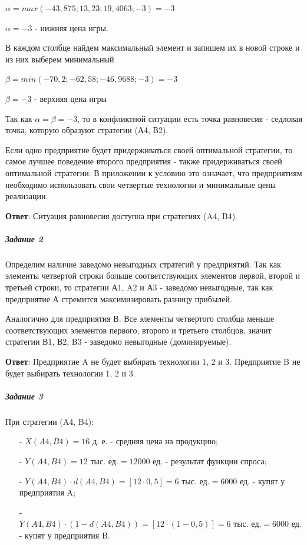 $\alpha = max(-43,875; 13,23; 19,4063; -3) = -3$

$\alpha = -3$ - нижняя цена игры.

В каждом столбце найдем максимальный элемент и запишем их в новой строке и из них
выберем минимальный

$\beta = min(-70,2; -62,58; -46,9688; -3) = -3$

$\beta = -3$ - верхняя цена игры

Так как $\alpha = \beta = -3$, то в конфликтной ситуации есть точка равновесия - седловая
точка, которую образуют стратегии (А4, В2).

Если одно предприятие будет придерживаться своей оптимальной стратегии,
то самое лучшее поведение второго предприятия - также придерживаться своей оптимальной стратегии.
В приложении к условию это означает, что предприятиям необходимо
использовать свои четвертые технологии и минимальные цены реализации.

\textbf{Ответ}: Ситуация равновесия доступна при стратегиях (A4, B4). 

\subparagraph{Задание 2} \hspace{0pt}

Определим наличие заведомо невыгодных стратегий у предприятий.
Так как элементы четвертой строки больше соответствующих элементов первой, второй и третьей строки,
то стратегии А1, A2 и А3 - заведомо невыгодные, так как предприятие А стремится максимизировать разницу прибылей.

Аналогично для предприятия В. Все элементы четвертого столбца меньше соответствующих элементов первого, второго и третьего столбцов,
значит стратегии В1, В2, B3 - заведомо невыгодные (доминируемые).

\textbf{Ответ}: Предприятие A не будет выбирать технологии 1, 2 и 3.
Предприятие B не будет выбирать технологии 1, 2 и 3.

\subparagraph{Задание 3} \hspace{0pt}

При стратегии (A4, B4):
\begin{enumerate}
  \item[-] $X(A4, B4) = 16 \text{ д. е.}$ - средняя цена на продукцию;
  \item[-] $Y(A4, B4) = 12 \text{ тыс. ед.} = 12000 \text{ ед.}$ - результат функции спроса;
  \item[-] $Y(A4, B4) \cdot  d(A4, B4) = [12 \cdot 0,5] = 6 \text{ тыс. ед.} = 6000 \text{ ед.}$ - купят у предприятия A;
  \item[-] $Y(A4, B4) \cdot (1 - d(A4, B4)) = [12 \cdot (1-0,5)] = 6 \text{ тыс. ед.} = 6000 \text{ ед.}$ - купят у предприятия B.
\end{enumerate}

